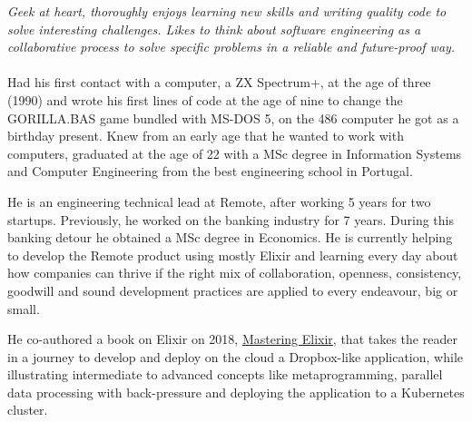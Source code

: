 \documentclass[10pt,a4paper]{article}
\begin{document}
\vspace{-1.3em}  %
\begin{multicols}{2}  %
\noindent \emph{Geek at heart, thoroughly enjoys learning new skills and writing
  quality code to solve interesting challenges. Likes to think about software
  engineering as a collaborative process to solve specific problems in a
  reliable and future-proof way.}
\\
\\
Had his first contact with a computer, a ZX Spectrum+, at the age of three
(1990) and wrote his first lines of code at the age of nine to change the
GORILLA.BAS game bundled with MS-DOS 5, on the 486 computer he got as a
birthday present. Knew from an early age that he wanted to work with computers,
graduated at the age of 22 with a MSc degree in Information Systems and Computer
Engineering from the best engineering school in Portugal.

He is an engineering technical lead at Remote, after working 5 years for two startups.
Previously, he worked on the banking industry for 7 years. During
this banking detour he obtained a MSc degree in Economics.
He is currently helping to develop the Remote product using mostly Elixir
and learning every day about how companies can thrive if the right mix
of collaboration, openness, consistency, goodwill and sound development practices
are applied to every endeavour, big or small.

He co-authored a book on Elixir on 2018,
\href{https://www.packtpub.com/application-development/mastering-elixir}{Mastering
Elixir}, that takes the reader in a journey to develop and deploy on the cloud
a Dropbox-like application, while illustrating intermediate to advanced concepts
like metaprogramming, parallel data processing with back-pressure and deploying
the application to a Kubernetes cluster.
\end{multicols}


\spacedhrule{0em}{-0.4em}

\end{document}
